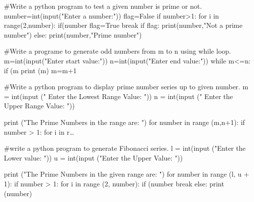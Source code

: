 #Write a python program to test a given number is prime or not.
number=int(input("Enter a number:"))
flag=False
if number>1:
	for i in range(2,number):
		if(number%
			flag=True
			break
if flag:
	print(number,"Not a prime number")
else:
	print(number,"Prime number")

#Write a programe to generate odd numbers from m to n using while loop.
m=int(input("Enter start value:"))
n=int(input("Enter end value:"))
while m<=n:
	if (m%
		print (m)
	m=m+1

#Write a python program to display prime number series up to given number.
m = int(input (" Enter the Lowest Range Value: "))  
n = int(input (" Enter the Upper Range Value: "))  
  
print ("The Prime Numbers in the range are: ")  
for number in range (m,n+1):  
    if number > 1:  
        for i in r…
		
#write a python program to generate Fibonacci series.
l = int(input ("Enter the Lower value: "))  
u = int(input ("Enter the Upper Value: "))  
  
print ("The Prime Numbers in the given range are: ")  
for number in range (l, u + 1):  
    if number > 1:  
        for i in range (2, number):  
            if (number %
                break  
        else:  
            print (number)